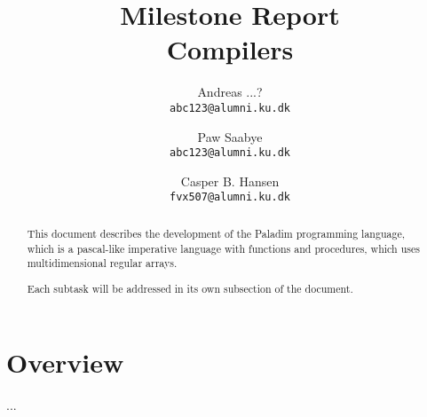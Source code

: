 \documentclass[11pt,a4paper]{article}
\title
{
	{\large Milestone Report}\\
	Compilers
}
\author
{
	Andreas ...?\\
	{\tt abc123@alumni.ku.dk}
	\and
	Paw Saabye\\
	{\tt abc123@alumni.ku.dk}
	\and
	Casper B. Hansen\\
	{\tt fvx507@alumni.ku.dk}
}
\begin{document}
\clearpage
\maketitle
\thispagestyle{empty}
\begin{multicols}{2}
\begin{abstract}
This document describes the development of the Paladim programming language,
which is a pascal-like imperative language with functions and procedures, which
uses multidimensional regular arrays.

Each subtask will be addressed in its own subsection of the document.
\end{abstract}
\vfill
\columnbreak
\tableofcontents
\end{multicols}

\clearpage
\section{Overview}
...
\end{document}
